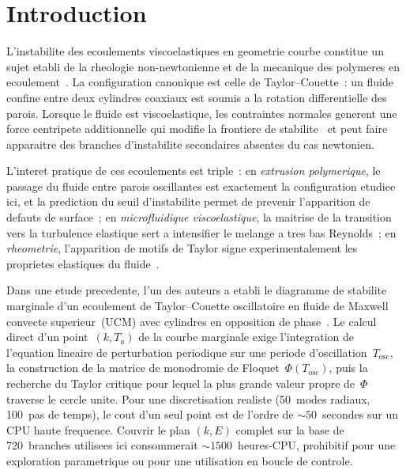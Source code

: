 \documentclass[11pt,a4paper]{article}
\newcommand{\Ta}{T_a}
\begin{document}
\section{Introduction}
\label{sec:intro}

L'instabilite des ecoulements viscoelastiques en geometrie courbe
constitue un sujet etabli de la rheologie non-newtonienne et de la
mecanique des polymeres en
ecoulement~\cite{larson1992,shaqfeh1996}. La configuration
canonique est celle de Taylor--Couette~: un fluide confine entre
deux cylindres coaxiaux est soumis a la rotation differentielle
des parois. Lorsque le fluide est viscoelastique, les contraintes
normales generent une force centripete additionnelle qui modifie
la frontiere de stabilite~\cite{larson1990} et peut faire
apparaitre des branches d'instabilite secondaires absentes du
cas newtonien.

L'interet pratique de ces ecoulements est triple~:
en \emph{extrusion polymerique}, le passage du fluide entre parois
oscillantes est exactement la configuration etudiee ici, et la
prediction du seuil d'instabilite permet de prevenir l'apparition
de defauts de surface~; en \emph{microfluidique viscoelastique},
la maitrise de la transition vers la turbulence elastique sert a
intensifier le melange a tres bas Reynolds~; en \emph{rheometrie},
l'apparition de motifs de Taylor signe experimentalement les
proprietes elastiques du fluide~\cite{shaqfeh1996}.

Dans une etude precedente, l'un des auteurs a etabli le diagramme
de stabilite marginale d'un ecoulement de Taylor--Couette
oscillatoire en fluide de Maxwell convecte superieur~(UCM) avec
cylindres en opposition de phase~\cite{hayani2021}. Le calcul
direct d'un point~$(k,\Ta)$ de la courbe marginale exige
l'integration de l'equation lineaire de perturbation periodique
sur une periode d'oscillation~$T_\text{osc}$, la construction de
la matrice de monodromie de Floquet~$\Phi(T_\text{osc})$, puis la
recherche du Taylor critique pour lequel la plus grande valeur
propre de~$\Phi$ traverse le cercle unite. Pour une discretisation
realiste (50~modes radiaux, 100~pas de temps),
le cout d'un seul point est de l'ordre de
$\sim\!50$~secondes sur un CPU haute frequence. Couvrir le plan
$(k,E)$ complet sur la base de 720~branches utilisees ici
consommerait $\sim\!1500$~heures-CPU, prohibitif pour une
exploration parametrique ou pour une utilisation en
boucle de controle.
\end{document}
